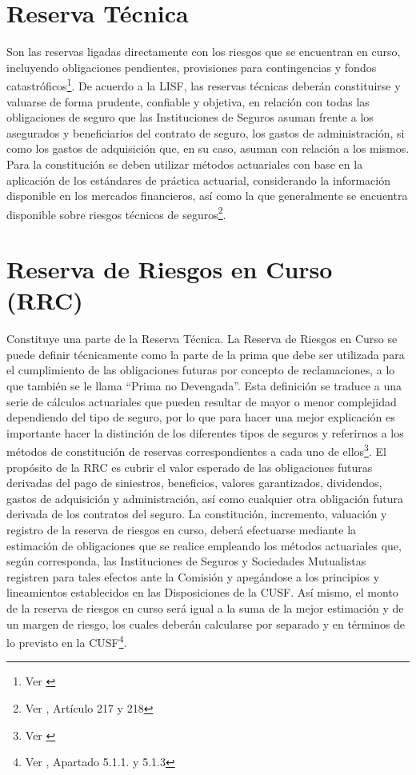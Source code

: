 \documentclass[11pt,twoside,openright,spanish]{report}
\numberwithin{equation}{chapter}
\numberwithin{figure}{chapter}
\numberwithin{table}{chapter}
\begin{document}
	\section{Reserva Técnica}
Son las reservas ligadas directamente con los riesgos que se encuentran en curso, incluyendo obligaciones pendientes, provisiones para contingencias y fondos catastróficos\footnote{Ver \citet{RResAssal}}.
De acuerdo a la LISF, las reservas técnicas deberán constituirse y valuarse de forma prudente, confiable y objetiva, en relación con todas las obligaciones de seguro que las Instituciones de Seguros asuman frente a los asegurados y beneficiarios del contrato de seguro, los gastos de administración, si como los gastos de adquisición que, en su caso, asuman con relación a los mismos. Para la constitución se deben utilizar métodos actuariales con base en la aplicación de los estándares de práctica actuarial, considerando la información disponible en los mercados financieros, así como la que generalmente se encuentra disponible sobre riesgos técnicos de seguros\footnote{Ver \citet{DReservasTec}, Artículo 217 y 218}. 


	\section{Reserva de Riesgos en Curso (RRC)}
Constituye una parte de la Reserva Técnica. La Reserva de Riesgos en Curso se puede definir técnicamente como la parte de la prima que debe ser utilizada para el cumplimiento de las obligaciones futuras por concepto de reclamaciones, a lo que también se le llama 
“Prima no Devengada”. Esta definición se traduce a una serie de cálculos actuariales que pueden resultar de mayor o menor complejidad dependiendo del tipo de seguro, por lo que para hacer una mejor explicación es importante hacer la distinción de los diferentes tipos de seguros y referirnos a los métodos de constitución de reservas correspondientes a cada uno de ellos\footnote{Ver \citet{RResAssal}}. El propósito de la RRC es cubrir el valor esperado de las obligaciones futuras derivadas del pago de siniestros, beneficios, valores garantizados, dividendos, gastos de adquisición y administración, así como cualquier otra obligación futura derivada de los contratos del seguro.
La constitución, incremento, valuación y registro de la reserva de riesgos en curso, deberá efectuarse mediante la estimación de obligaciones que se realice empleando los métodos actuariales que, según corresponda, las Instituciones de Seguros y Sociedades Mutualistas registren para tales efectos ante la Comisión y apegándose a los principios y lineamientos establecidos en las Disposiciones de la CUSF. Así mismo, el monto de la reserva de riesgos en curso será igual a la suma de la mejor estimación y de un margen de riesgo, los cuales deberán calcularse por separado y en términos de lo previsto en la CUSF\footnote{Ver \citet{HCusf}, Apartado 5.1.1. y 5.1.3}.
\end{document}
